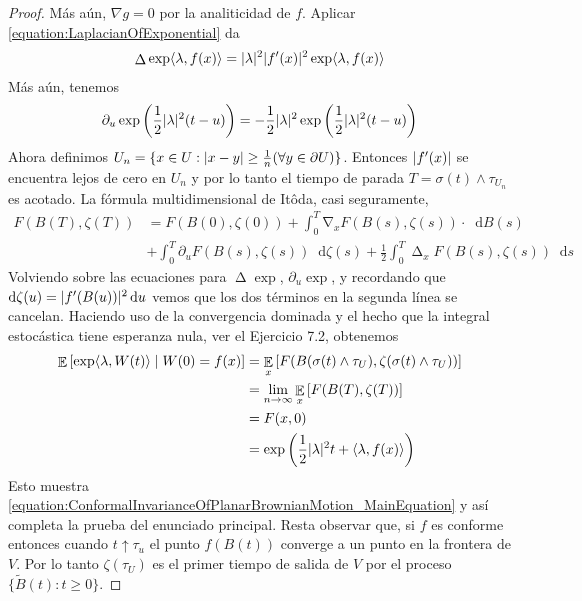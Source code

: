 \documentclass{article}
\newcommand{\ito}{Itô}
\newcommand{\dd}{\mathop{}\!\mathrm{d}}
\DeclareMathOperator{\laplacian}{\Delta}
\DeclareMathOperator{\grad}{\nabla}
\DeclareMathOperator{\Expectation}{\mathbb{E}}
\DeclarePairedDelimiter{\abs}{\lvert}{\rvert}
\DeclarePairedDelimiter{\ang}{\langle}{\rangle}
\theoremstyle{plain}
\theoremstyle{remark}
\theoremstyle{definition}
\begin{document}
\begin{proof}
  Más aún, \(\nabla g = 0\) por la analiticidad de \(f\).
  Aplicar \ref{equation:LaplacianOfExponential} da
  \begin{align}
    \laplacian \exp \ang{\lambda, f(x)}
    =
    \abs{\lambda}^2 \abs{f'(x)}^2 \exp \ang{\lambda, f(x)}
  \end{align}
  Más aún, tenemos
  \begin{align}
    \partial_u \exp\left( \frac{1}{2} \abs{\lambda}^2 (t - u) \right)
    =
    - \frac{1}{2} \abs{\lambda}^2 \exp\left( \frac{1}{2} \abs{\lambda}^2 (t - u)\right)
  \end{align}
  Ahora definimos \(U_n = \{x \in U : \abs{x - y} \geq \frac{1}{n} (\forall y \in \partial U)\}\).
  Entonces \(\abs{f'(x)}\) se encuentra lejos de cero en \(U_n\) y por lo tanto el tiempo de parada \(T = \sigma(t) \wedge \tau_{U_n}\) es acotado.
  La fórmula multidimensional de \ito da, casi seguramente,
  \begin{align}
    F(B(T), \zeta(T))
    &=
    F(B(0), \zeta(0))
    + \int_0^T \grad_x F(B(s), \zeta(s)) \cdot \dd B(s)
    \\
    &+
    \int_0^T \partial_u F(B(s), \zeta(s)) \dd \zeta(s)
    + \frac{1}{2} \int_0^T \laplacian_x F(B(s), \zeta(s)) \dd s
  \end{align}
  Volviendo sobre las ecuaciones para \(\laplacian \exp\), \(\partial_u \exp\), y recordando que \(\dd \zeta(u) = \abs{f'(B(u))}^2 \dd u\) vemos que los dos términos en la segunda línea se cancelan.
  Haciendo uso de la convergencia dominada y el hecho que la integral estocástica tiene esperanza nula, ver el Ejercicio 7.2, obtenemos
  \begin{align}
    \Expectation \left[
      \exp \ang{\lambda, W(t)}
      \mid
      W(0) = f(x)
    \right]
    &=
    \Expectation_x \left[ F(B(\sigma(t) \wedge \tau_U), \zeta(\sigma(t) \wedge \tau_U))\right]
    \\
    &=
    \lim_{n \rightarrow \infty} \Expectation_x \left[F(B(T), \zeta(T))\right]
    \\
    &=
    F(x, 0)
    \\
    &=
    \exp \left( \frac{1}{2} \abs{\lambda}^2 t + \ang{\lambda, f(x)} \right)
  \end{align}
  Esto muestra \eqref{equation:ConformalInvarianceOfPlanarBrownianMotion_MainEquation} y así completa la prueba del enunciado principal.
  Resta observar que, si \(f\) es conforme entonces cuando \(t \uparrow \tau_u\) el punto \(f(B(t))\) converge a un punto en la frontera de \(V\).
  Por lo tanto \(\zeta(\tau_U)\) es el primer tiempo de salida de \(V\) por el proceso \(\{\widetilde{B}(t) : t \geq 0\}\).
\end{proof}
\end{document}
